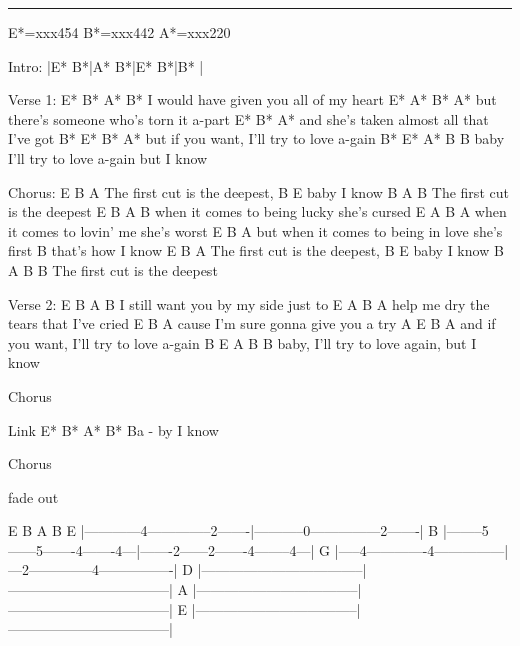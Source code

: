 \noindent\rule{\columnwidth}{1pt}

\begin{multicols}{2}
\begin{lstsong}
E*=xxx454
B*=xxx442
A*=xxx220

Intro: |E*  B*|A*  B*|E*  B*|B*  |

Verse 1:
             E*        B*         A*     B*
I would have given you all of my heart
            E*            A*        B*   A*
but there's someone who's torn it a-part
          E*           B*            A*
and she's taken almost all that I've got
     B*               E*            B*   A*
but if you want, I'll try to love a-gain
B*         E*           A*          B    B
baby I'll try to love a-gain but I know

Chorus:
E            B          A
   The first cut is the deepest,
B       E
baby I know
     B                A       B
The first cut is the deepest
        E              B           A     B
when it comes to being lucky she's cursed
        E               A        B     A
when it comes to lovin' me she's worst
            E                 B           A
but when it comes to being in love she's first
       B
that's how I know
E            B           A
   The first cut is the deepest,
B       E
baby I know
          B           A     B   B
The first cut is the deepest

Verse 2:
        E        B     A    B
I still want you by my side   just to
E               A               B      A
help me dry the tears that I've cried
          E               B     A
cause I'm sure gonna give you a try
     A                E             B     A
and if you want, I'll try to love a-gain
B           E           A            B    B
baby, I'll try to love again, but I know

Chorus

Link
E*  B*  A*   B*
        Ba - by I know

Chorus

fade out
\end{lstsong}
\end{multicols}


\begin{lsttab}


        E             B                   A              B
E |------------4--------------2-------|-----------0---------------2-------|
B |--------5------5-------4-------4---|-------2------2-------4--------4---|
G |-----4-------------4---------------|---2--------------4----------------|
D |-----------------------------------|-----------------------------------|
A |-----------------------------------|-----------------------------------|
E |-----------------------------------|-----------------------------------|
\end{lsttab}
\newpage

